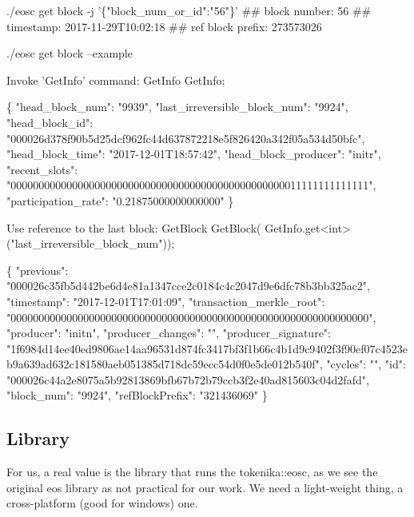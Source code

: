 \begin{DoxyCode}
./eosc get block -j '\{"block\_num\_or\_id":"56"\}'
##         block number: 56
##            timestamp: 2017-11-29T10:02:18
##     ref block prefix: 273573026
\end{DoxyCode}
 
\begin{DoxyCode}
./eosc get block --example
\end{DoxyCode}
 
\begin{DoxyCode}
Invoke 'GetInfo' command:
GetInfo GetInfo;

\{
    "head\_block\_num": "9939",
    "last\_irreversible\_block\_num": "9924",
    "head\_block\_id": "000026d378f90b5d25dcf962fc44d637872218e5f826420a342f05a534d50bfc",
    "head\_block\_time": "2017-12-01T18:57:42",
    "head\_block\_producer": "initr",
    "recent\_slots": "0000000000000000000000000000000000000000000000000011111111111111",
    "participation\_rate": "0.21875000000000000"
\}


Use reference to the last block:
GetBlock GetBlock(
  GetInfo.get<int>("last\_irreversible\_block\_num"));

\{
    "previous": "000026c35fb5d442be6d4e81a1347cce2c0184c4c2047d9e6dfc78b3bb325ac2",
    "timestamp": "2017-12-01T17:01:09",
    "transaction\_merkle\_root": "0000000000000000000000000000000000000000000000000000000000000000",
    "producer": "initn",
    "producer\_changes": "",
    "producer\_signature":
       "1f6984d14ee40ed9806ae14aa96531d874fc3417bf3f1b66c4b1d9c9402f3f90ef07c4523eb9a639ad632c181580aeb051385d718dc59ecc54d0f0e5de012b540f",
    "cycles": "",
    "id": "000026c44a2e8075a5b92813869bfb67b72b79ccb3f2e40ad815603c04d2fafd",
    "block\_num": "9924",
    "refBlockPrefix": "321436069"
\}
\end{DoxyCode}
 \subsection*{Library}

For us, a real value is the library that runs the tokenika\+::eosc, as we see the original eos library as not practical for our work. We need a light-\/weight thing, a cross-\/platform (good for windows) one.

